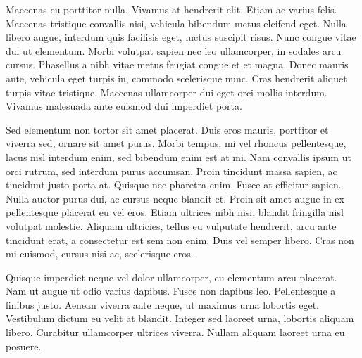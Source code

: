 Maecenas eu porttitor nulla. Vivamus at hendrerit elit. Etiam ac varius felis. Maecenas tristique convallis nisi, vehicula bibendum metus eleifend eget. Nulla libero augue, interdum quis facilisis eget, luctus suscipit risus. Nunc congue vitae dui ut elementum. Morbi volutpat sapien nec leo ullamcorper, in sodales arcu cursus. Phasellus a nibh vitae metus feugiat congue et et magna. Donec mauris ante, vehicula eget turpis in, commodo scelerisque nunc. Cras hendrerit aliquet turpis vitae tristique. Maecenas ullamcorper dui eget orci mollis interdum. Vivamus malesuada ante euismod dui imperdiet porta.

Sed elementum non tortor sit amet placerat. Duis eros mauris, porttitor et viverra sed, ornare sit amet purus. Morbi tempus, mi vel rhoncus pellentesque, lacus nisl interdum enim, sed bibendum enim est at mi. Nam convallis ipsum ut orci rutrum, sed interdum purus accumsan. Proin tincidunt massa sapien, ac tincidunt justo porta at. Quisque nec pharetra enim. Fusce at efficitur sapien. Nulla auctor purus dui, ac cursus neque blandit et. Proin sit amet augue in ex pellentesque placerat eu vel eros. Etiam ultrices nibh nisi, blandit fringilla nisl volutpat molestie. Aliquam ultricies, tellus eu vulputate hendrerit, arcu ante tincidunt erat, a consectetur est sem non enim. Duis vel semper libero. Cras non mi euismod, cursus nisi ac, scelerisque eros.

Quisque imperdiet neque vel dolor ullamcorper, eu elementum arcu placerat. Nam ut augue ut odio varius dapibus. Fusce non dapibus leo. Pellentesque a finibus justo. Aenean viverra ante neque, ut maximus urna lobortis eget. Vestibulum dictum eu velit at blandit. Integer sed laoreet urna, lobortis aliquam libero. Curabitur ullamcorper ultrices viverra. Nullam aliquam laoreet urna eu posuere.
